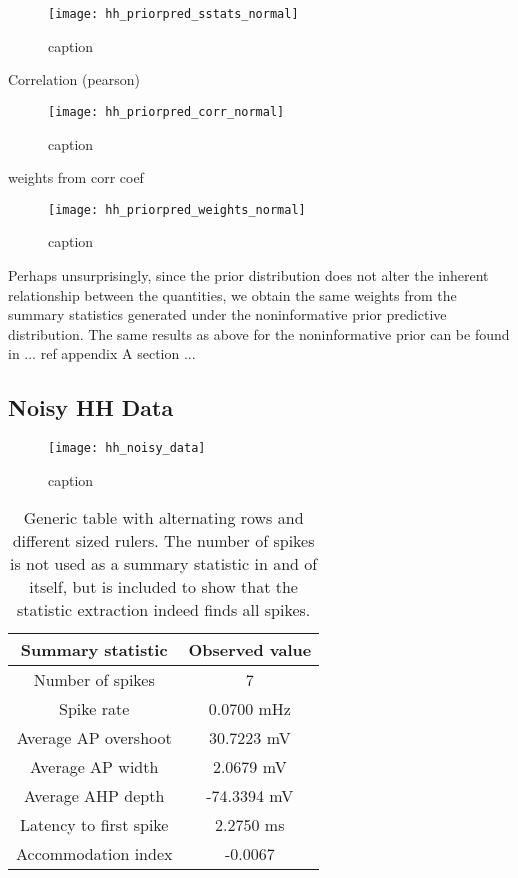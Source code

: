 \begin{figure}[H]
    \centering
    \texttt{[image: hh\_priorpred\_sstats\_normal]}
    \caption{caption}
    \label{fig:fig1}
\end{figure} 


Correlation (pearson) 

\begin{figure}[H]
    \centering
    \texttt{[image: hh\_priorpred\_corr\_normal]}
    \caption{caption}
    \label{fig:fig1}
\end{figure} 

weights from corr coef

\begin{figure}[H]
    \centering
    \texttt{[image: hh\_priorpred\_weights\_normal]}
    \caption{caption}
    \label{fig:fig1}
\end{figure} 

Perhaps unsurprisingly, since the prior distribution does not alter the inherent relationship between the quantities, we obtain the same weights from the summary statistics generated under the noninformative prior predictive distribution. The same results as above for the noninformative prior can be found in ... ref appendix A section ...

%


\subsection{Noisy HH Data}

\begin{figure}[H]
    \centering
    \texttt{[image: hh\_noisy\_data]}
    \caption{caption}
    \label{fig:fig1}
\end{figure} 


\begin{table}[H]
  \caption{Generic table with alternating rows and different sized rulers. The number of spikes is not used as a summary statistic in and of itself, but is included to show that the statistic extraction indeed finds all spikes.}
  \begin{center}
    \begin{tabular}{cc}
      \toprule
      \textbf{Summary statistic} & \textbf{Observed value} \\
      \midrule
      Number of spikes &  7 \\
      Spike rate &  0.0700 mHz \\
      Average AP overshoot & 30.7223 mV  \\
      Average AP width & 2.0679 mV \\
      Average AHP depth & -74.3394 mV \\
      Latency to first spike & 2.2750 ms \\
      Accommodation index &  -0.0067 \\
      \bottomrule
    \end{tabular}
  \end{center}
  \label{tab:hh_noisy_sumstats}
\end{table}



